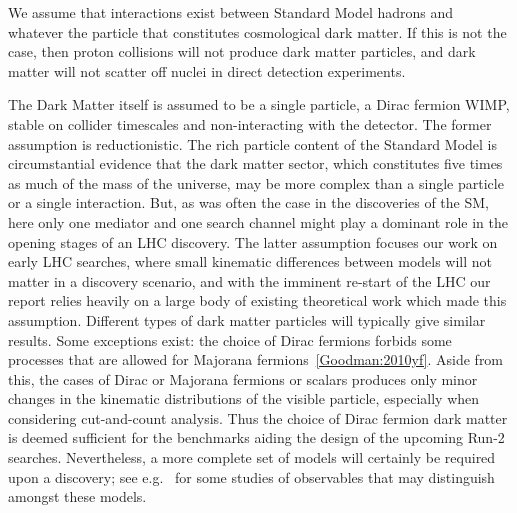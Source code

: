 We assume that interactions exist between Standard Model hadrons
and whatever the particle that constitutes cosmological dark matter. If this
is not the case, then proton collisions will not produce dark matter
particles, and dark matter will not scatter off nuclei in direct
detection experiments.

The Dark Matter itself is assumed to be a single particle, a Dirac
fermion WIMP, stable on collider timescales and non-interacting with
the detector.  
The former assumption is reductionistic.
The rich particle content of the Standard Model is circumstantial evidence that
the dark matter sector, which constitutes five times as much of the
mass of the universe, may be more complex than a single particle or a
single interaction. But, as was often the case in the discoveries of
the SM, here only one mediator and one search channel might play a
dominant role in the opening stages of an LHC discovery. The latter
assumption focuses our work on early LHC searches, where small
kinematic differences between models will not matter in a discovery
scenario, and with the imminent re-start of the LHC our report relies
heavily on a large body of existing theoretical work which made this
assumption. Different types of dark matter particles will typically
give similar results.
Some exceptions exist:  the choice of Dirac fermions forbids some
processes that are allowed for Majorana fermions~\ref{Goodman:2010yf}.
Aside from this, the cases
of Dirac or Majorana fermions or scalars produces only minor changes
in the kinematic distributions of the visible particle, especially
when considering cut-and-count analysis. Thus the choice of Dirac
fermion dark matter is deemed sufficient for the benchmarks aiding the
design of the upcoming Run-2 searches. Nevertheless, a more complete
set of models will certainly be required upon a discovery; see
e.g.~\cite{Cotta:2012nj,Haisch:2013fla,Crivellin:2015wva} for some
studies of observables that may distinguish amongst these models.

